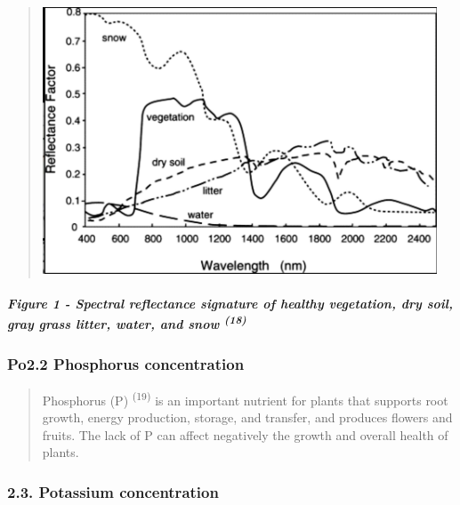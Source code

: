 \documentclass[
]{article}
\begin{document}
\begin{quote}
\includegraphics[width=4.61592in,height=3.12691in]{vertopal_f239f640fefe43bb8bc0698cafd57825/media/image11.png}
\end{quote}

\hypertarget{figure-1---spectral-reflectance-signature-of-healthy-vegetation-dry-soil-gray-grass-litter-water-and-snow-18}{%
\subparagraph{\texorpdfstring{\textbf{Figure 1} - Spectral reflectance
signature of healthy vegetation, dry soil, gray grass litter, water, and
snow
\textsuperscript{(18)}}{Figure 1 - Spectral reflectance signature of healthy vegetation, dry soil, gray grass litter, water, and snow (18)}}\label{figure-1---spectral-reflectance-signature-of-healthy-vegetation-dry-soil-gray-grass-litter-water-and-snow-18}}

\hypertarget{po2.2-phosphorus-concentration}{%
\subsubsection{\texorpdfstring{\textbf{Po2.2 Phosphorus
concentration}}{Po2.2 Phosphorus concentration}}\label{po2.2-phosphorus-concentration}}

\begin{quote}
Phosphorus (P) \textsuperscript{(19)} is an important nutrient for
plants that supports root growth, energy production, storage, and
transfer, and produces flowers and fruits. The lack of P can affect
negatively the growth and overall health of plants.
\end{quote}

\hypertarget{potassium-concentration}{%
\subsubsection{\texorpdfstring{\textbf{2.3. Potassium
concentration}}{2.3. Potassium concentration}}\label{potassium-concentration}}
\end{document}
